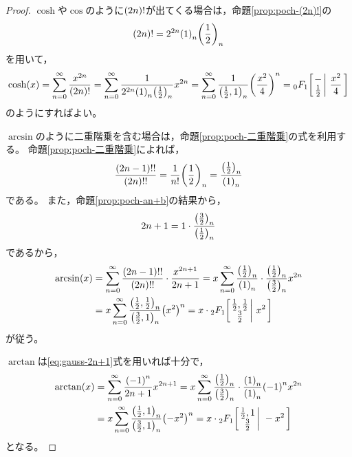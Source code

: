 \documentclass[a4paper,draft]{ltjsarticle}
\begin{document}
\begin{thm}
\begin{proof}
        $\cosh$や$\cos$のように$\pare{2n}!$が出てくる場合は，命題\ref{prop:poch-(2n)!}の
        \begin{equation}
            \pare{2n}!=2^{2n}\poch{1}{n}\poch{\frac{1}{2}}{n}
        \end{equation}
        を用いて，
        \begin{equation}
            \fun{\cosh}{x}=\sum_{n=0}^\infty \frac{x^{2n}}{\pare{2n}!}
            =\sum_{n=0}^\infty \frac{1}{2^{2n}\poch{1}{n}\poch{\frac{1}{2}}{n}}x^{2n}
            =\sum_{n=0}^\infty \frac{1}{\poch{\frac{1}{2},1}{n}}\pare{\frac{x^2}{4}}^n
            =\pfq{0}{1}{-}{\frac{1}{2}}{\frac{x^2}{4}}
        \end{equation}
        のようにすればよい。

        $\arcsin$のように二重階乗を含む場合は，命題\ref{prop:poch-二重階乗}の式を利用する。
        命題\ref{prop:poch-二重階乗}によれば，
        \begin{equation}
            \frac{\pare{2n-1}!!}{\pare{2n}!!}=\frac{1}{n!}\poch{\frac{1}{2}}{n}=\frac{\poch{\frac{1}{2}}{n}}{\poch{1}{n}}
        \end{equation}
        である。
        また，命題\ref{prop:poch-an+b}の結果から，
        \begin{equation}
            2n+1=1\cdot\frac{\poch{\frac{3}{2}}{n}}{\poch{\frac{1}{2}}{n}}\label{eq:gauss-2n+1}
        \end{equation}
        であるから，
        \begin{align}
            \fun{\arcsin}{x}&=\sum_{n=0}^\infty \frac{\pare{2n-1}!!}{\pare{2n}!!}\cdot \frac{x^{2n+1}}{2n+1}=x\sum_{n=0}^\infty \frac{\poch{\frac{1}{2}}{n}}{\poch{1}{n}}\cdot\frac{\poch{\frac{1}{2}}{n}}{\poch{\frac{3}{2}}{n}}x^{2n}
            \\
            &=x\sum_{n=0}^\infty \frac{\poch{\frac{1}{2},\frac{1}{2}}{n}}{\poch{\frac{3}{2},1}{n}}\pare{x^2}^n
            =x\cdot \Gauss{\frac{1}{2}}{\frac{1}{2}}{\frac{3}{2}}{x^2}
        \end{align}
        が従う。

        $\arctan$は\eqref{eq:gauss-2n+1}式を用いれば十分で，
        \begin{align}
            \fun{\arctan}{x}&=\sum_{n=0}^\infty \frac{\pare{-1}^n}{2n+1}x^{2n+1}=x\sum_{n=0}^\infty \frac{\poch{\frac{1}{2}}{n}}{\poch{\frac{3}{2}}{n}}\cdot \frac{\poch{1}{n}}{\poch{1}{n}}\pare{-1}^nx^{2n}
            \\
            &=x\sum_{n=0}^\infty \frac{\poch{\frac{1}{2},1}{n}}{\poch{\frac{3}{2},1}{n}}\pare{-x^2}^n
            =x\cdot  \Gauss{\frac{1}{2}}{1}{\frac{3}{2}}{-x^2}
        \end{align}
        となる。
    \end{proof}
\end{thm}
\end{document}

